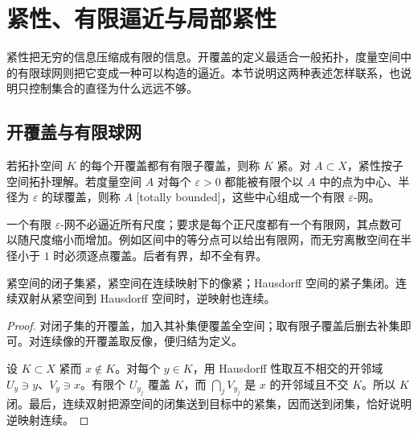 \section{紧性、有限逼近与局部紧性}
\label{b1:sec:A102}

紧性把无穷的信息压缩成有限的信息。开覆盖的定义最适合一般拓扑，度量空间中的有限球网则把它变成一种可以构造的逼近。本节说明这两种表述怎样联系，也说明只控制集合的直径为什么远远不够。

\subsection{开覆盖与有限球网}
\label{b1:subsec:A10201}

\begin{definition}\label{b1:def:app-compact}
若拓扑空间 \(K\) 的每个开覆盖都有有限子覆盖，则称 \(K\) 紧。对 \(A\subset X\)，紧性按子空间拓扑理解。若度量空间 \(A\) 对每个 \(\varepsilon>0\) 都能被有限个以 \(A\) 中的点为中心、半径为 \(\varepsilon\) 的球覆盖，则称 \(A\) [totally bounded]，这些中心组成一个有限 \(\varepsilon\)-网。
\end{definition}

一个有限 \(\varepsilon\)-网不必逼近所有尺度；要求是每个正尺度都有一个有限网，其点数可以随尺度缩小而增加。例如区间中的等分点可以给出有限网，而无穷离散空间在半径小于 \(1\) 时必须逐点覆盖。后者有界，却不全有界。

\begin{lemma}\label{b1:lem:app-compact-properties}
紧空间的闭子集紧，紧空间在连续映射下的像紧；Hausdorff 空间的紧子集闭。连续双射从紧空间到 Hausdorff 空间时，逆映射也连续。
\end{lemma}
\begin{proof}
对闭子集的开覆盖，加入其补集便覆盖全空间；取有限子覆盖后删去补集即可。对连续像的开覆盖取反像，便归结为定义。

设 \(K\subset X\) 紧而 \(x\notin K\)。对每个 \(y\in K\)，用 Hausdorff 性取互不相交的开邻域 \(U_y\ni y\)、\(V_y\ni x\)。有限个 \(U_{y_j}\) 覆盖 \(K\)，而 \(\bigcap_jV_{y_j}\) 是 \(x\) 的开邻域且不交 \(K\)。所以 \(K\) 闭。最后，连续双射把源空间的闭集送到目标中的紧集，因而送到闭集，恰好说明逆映射连续。
\end{proof}

